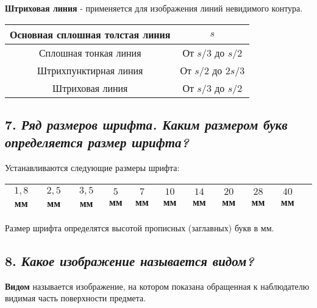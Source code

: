 \textbf{Штриховая линия} - применяется для изображения линий невидимого контура.



\vspace{14pt} 
\begin{center}
\begin{tabular}{|c|c|}
\hline




Основная сплошная толстая линия&$s$\\ \hline

Сплошная тонкая линия&От $s/3$ до $s/2$\\ \hline

Штрихпунктирная линия&От $s/2$ до $2s/3$\\ \hline

Штриховая линия&От $s/3$ до $s/2$\\ \hline

\hline
\end{tabular}
\end{center}
\subsection*{7. \textit{Ряд размеров шрифта. Каким размером букв определяется размер шрифта?}}

Устанавливаются следующие размеры шрифта:
\begin{center}
\begin{tabular}{|c|c|c|c|c|c|c|c|c|c|c|}
\hline




$1,8$мм&$2,5$мм&$3,5$мм&$5$мм&$7$мм&$10$мм&$14$мм&$20$мм&$28$мм&$40$мм\\ \hline

\hline
\end{tabular}
\end{center}

Размер шрифта определятся высотой прописных (заглавных) букв в мм.
\subsection*{8. \textit{Какое изображение называется видом?}}

\textbf{Видом} называется изображение, на котором показана обращенная к наблюдателю видимая часть поверхности предмета.
